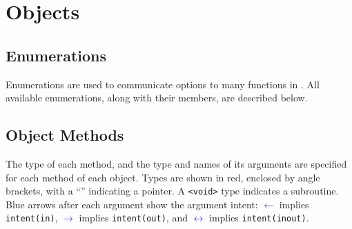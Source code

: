 \section{Objects}

\subsection{Enumerations}

Enumerations are used to communicate options to many functions in \glc. All available enumerations, along with their members, are described below.



\subsection{Object Methods}

The type of each method, and the type and names of its arguments are specified for each method of each object. Types are shown in red, enclosed by angle brackets, with a ``{\tt *}'' indicating a pointer. A {\tt \textless void\textgreater} type indicates a subroutine. Blue arrows after each argument show the argument intent: \textcolor{blue}{$\leftarrow$} implies {\tt intent(in)},  \textcolor{blue}{$\rightarrow$} implies {\tt intent(out)}, and \textcolor{blue}{$\leftrightarrow$} implies {\tt intent(inout)}.



